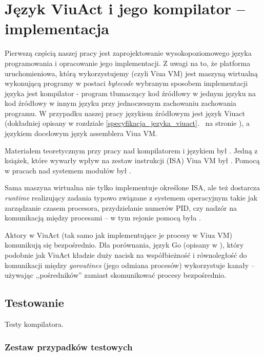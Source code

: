 \chapter{Język ViuAct i jego kompilator -- implementacja}
\label{viuact_impl}
\label{jezyk_viuact_i_jego_kompilator}

Pierwszą częścią naszej pracy jest zaprojektowanie wysokopoziomowego języka programowania i opracowanie jego
implementacji. Z uwagi na to, że platforma uruchomieniowa, którą wykorzystujemy (czyli Viua VM) jest maszyną
wirtualną wykonującą programy w postaci \emph{bytecode} wybranym sposobem implementacji języka jest
kompilator - program tłumaczący kod źródłowy w jednym języku na kod źródłowy w innym języku przy jednoczesnym
zachowaniu zachowania programu. W przypadku naszej pracy językiem źródłowym jest język Viuact (dokładniej
opisany w rozdziale \ref{specyfikacja_jezyka_viuact}.~ na stronie
\pageref{specyfikacja_jezyka_viuact}), a językiem docelowym język assemblera Viua VM.

Materiałem teoretycznym przy pracy nad kompilatorem i językiem był \cite{PLP:1}.
Jedną z książek, które wywarły wpływ na zestaw instrukcji (ISA) Viua VM był \cite{RISCV}.
Pomocą w pracach nad systemem modułów był \cite{Linkers}.

Sama maszyna wirtualna nie tylko implementuje określone ISA, ale też dostarcza \emph{runtime} realizujący
zadania typowo związane z systemem operacyjnym takie jak zarządzanie czasem procesora, przydzielanie numerów
PID, czy nadzór na komunikacją między procesami -- w tym rejonie pomocą była \cite{OperatingSystems}.

Aktory w ViuAct (tak samo jak implementujące je procesy w Viua VM) komunikują się bezpośrednio.
Dla porównania, język Go (opisany w \cite{Golang}), który podobnie jak ViuAct kładzie duży nacisk na
współbieżność i równoległość do komunikacji między \emph{goroutines} (jego odmiana procesów) wykorzystuje
kanały -- używając ,,pośredników'' zamiast skomunikować procesy bezpośrednio.





\section{Testowanie}

Testy kompilatora.

\subsection{Zestaw przypadków testowych}

